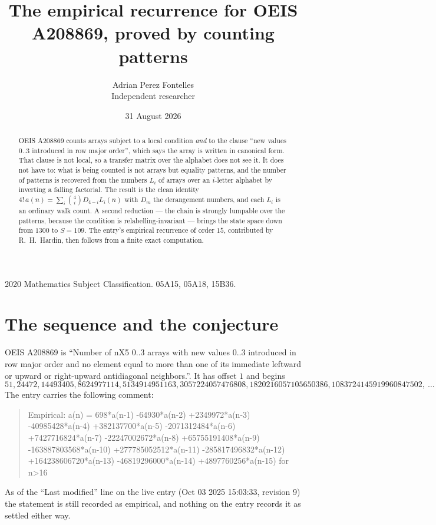 \documentclass[11pt,a4paper]{article}
\title{The empirical recurrence for OEIS A208869, proved by counting patterns}
\author{Adrian Perez Fontelles\\ \small Independent researcher}
\date{31 August 2026}
\theoremstyle{plain}
\theoremstyle{definition}
\begin{document}
\maketitle

\begin{abstract}
OEIS A208869 counts arrays subject to a local condition \emph{and} to the clause ``new values
$0..3$ introduced in row major order'', which says the array is written in canonical
form. That clause is not local, so a transfer matrix over the alphabet does not see it. It
does not have to: what is being counted is not arrays but equality patterns, and the number
of patterns is recovered from the numbers $L_i$ of arrays over an $i$-letter alphabet by
inverting a falling factorial. The result is the clean identity
$4!\,a(n)=\sum_i\binom{4}{i}D_{4-i}L_i(n)$ with $D_m$ the derangement numbers,
and each $L_i$ is an ordinary walk count. A second reduction --- the chain is strongly
lumpable over the patterns, because the condition is relabelling-invariant --- brings the
state space down from $1300$ to $S=109$. The entry's empirical recurrence of order
$15$, contributed by R.~H.~Hardin, then follows from a finite exact computation.
\end{abstract}

\noindent\small 2020 Mathematics Subject Classification. 05A15, 05A18, 15B36.\normalsize

\section{The sequence and the conjecture}

OEIS A208869 is ``Number of nX5 0..3 arrays with new values 0..3 introduced in row major order and no element equal to more than one of its immediate leftward or upward or right-upward antidiagonal neighbors.''. It has offset $1$ and begins
\[
51, 24472, 14493405, 8624977114, 5134914951163, 3057224057476808, 1820216057105650386, 1083724145919960847502,\ \dots
\]
The entry carries the following comment:
\begin{quote}\small
Empirical: a(n) = 698*a(n-1) -64930*a(n-2) +2349972*a(n-3) -40985428*a(n-4) +382137700*a(n-5) -2071312484*a(n-6) +7427716824*a(n-7) -22247002672*a(n-8) +65755191408*a(n-9) -163887803568*a(n-10) +277785052512*a(n-11) -285817496832*a(n-12) +164238606720*a(n-13) -46819296000*a(n-14) +4897760256*a(n-15) for n>16
\end{quote}
As of the ``Last modified'' line on the live entry (Oct 03 2025 15:03:33, revision 9) the statement is
still recorded as empirical, and nothing on the entry records it as settled either way.
\end{document}
